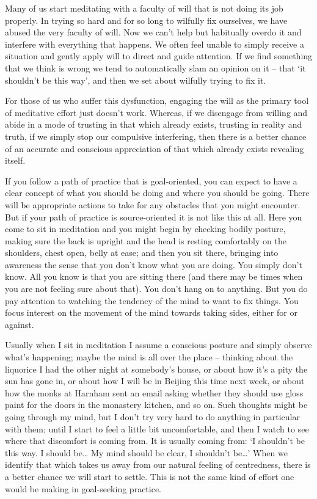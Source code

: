 Many of us start meditating with a faculty of will that is not doing its
job properly. In trying so hard and for so long to wilfully fix
ourselves, we have abused the very faculty of will. Now we can't
help but habitually overdo it and interfere with everything that
happens. We often feel unable to simply receive a situation and gently
apply will to direct and guide attention. If we find something that we
think is wrong we tend to automatically slam an opinion on it -- that
`it shouldn't be this way', and then we set about wilfully trying to fix
it.

For those of us who suffer this dysfunction, engaging the will as the
primary tool of meditative effort just doesn't work. Whereas, if we
disengage from willing and abide in a mode of trusting in that which
already exists, trusting in reality and truth, if we simply stop our
compulsive interfering, then there is a better chance of an accurate and conscious appreciation of
that which already exists revealing itself.

If you follow a path of practice that is goal-oriented, you can expect
to have a clear concept of what you should be doing and where you should
be going. There will be appropriate actions to take for any obstacles
that you might encounter. But if your path of practice is
source-oriented it is not like this at all. Here you come to sit in
meditation and you might begin by checking bodily posture, making sure
the back is upright and the head is resting comfortably on the
shoulders, chest open, belly at ease; and then you sit there, bringing
into awareness the sense that you don't know what you are doing. You
simply don't know. All you know is that you are sitting there (and there
may be times when you are not feeling sure about that). You don't hang on to
anything. But you do pay attention to watching the tendency of the mind
to want to fix things. You focus interest on the movement of the mind
towards taking sides, either for or against.

Usually when I sit in meditation I assume a conscious
posture and simply observe what's happening; maybe the mind is all over
the place -- thinking about the liquorice I had the other night at
somebody's house, or about how it's a pity the sun has gone in, or about
how I will be in Beijing this time next week, or about how the monks at
Harnham sent an email asking whether they should use gloss paint for the
doors in the monastery kitchen, and so on. Such thoughts might be going
through my mind, but I don't try very hard to do anything in particular with them;
until I start to feel a little bit uncomfortable,
and then I watch to see where that discomfort is coming from. It is
usually coming from: `I shouldn't be this way. I should
be\ldots{} My mind should be clear, I shouldn't be\ldots{}'
When we identify that which takes us away
from our natural feeling of centredness, there is a better chance we will start to settle. This is not the
same kind of effort one would be making in goal-seeking practice.

